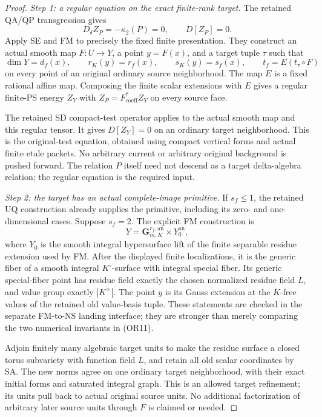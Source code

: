 \begin{proof}
\emph{Step 1: a regular equation on the exact finite-rank target.}
The retained QA/QP transgression gives
\[
                        D_\delta Z_P=-\kappa_2(P)=0,
                         \qquad D[Z_P]=0.
\tag{OR10}
\]
Apply SE and FM to precisely the fixed finite presentation. They
construct an actual smooth map \(F:U\to Y\), a point \(y=F(x)\),
and a target tuple \(\tau\) such that
\[
 \dim Y=d_f(x),\qquad r_K(y)=r_f(x),\qquad s_K(y)=s_f(x),
                    \qquad t_f=E(t_\tau\circ F)
\tag{OR11}
\]
on every point of an original ordinary source neighborhood.
The map \(E\) is a fixed rational affine map. Composing the
finite scalar extensions with \(E\) gives a regular finite-PS
energy \(Z_Y\) with
\(Z_P=F^*_{\mathrm{coeff}}Z_Y\) on every source face.

The retained SD compact-test operator applies to the actual smooth
map and this regular tensor. It gives \(D[Z_Y]=0\) on an ordinary
target neighborhood. This is the original-test equation, obtained
using compact vertical forms and actual finite etale packets.
No arbitrary current or arbitrary original background is pushed
forward. The relation \(P\) itself need not descend as a target
delta-algebra relation; the regular equation is the required input.

\emph{Step 2: the target has an actual complete-image primitive.}
If \(s_f\le1\), the retained UQ construction already supplies the
primitive, including its zero- and one-dimensional cases. Suppose
\(s_f=2\). The explicit FM construction is
\[
                 Y=\mathbf G_{m,K}^{r_f,\mathrm{an}}
                              \times Y_0^{\mathrm{an}},
\tag{OR12}
\]
where \(Y_0\) is the smooth integral hypersurface lift of the
finite separable residue extension used by FM. After the displayed
finite localizations, it is the generic fiber of a smooth integral
\(K^\circ\)-surface with integral special fiber. Its generic
special-fiber point has residue field exactly the chosen normalized
residue field \(L\), and value group exactly \(|K^\times|\).
The point \(y\) is its Gauss extension at the \(K\)-free values
of the retained old value-basis tuple. These statements are checked
in the separate FM-to-NS landing interface; they are stronger than
merely comparing the two numerical invariants in (OR11).

Adjoin finitely many algebraic target units to make the residue
surface a closed torus subvariety with function field \(L\), and
retain all old scalar coordinates by SA. The new norms agree on
one ordinary target neighborhood, with their exact initial forms
and saturated integral graph. This is an allowed target refinement;
its units pull back to actual original source units. No additional
factorization of arbitrary later source units through \(F\) is
claimed or needed.


\end{proof}
